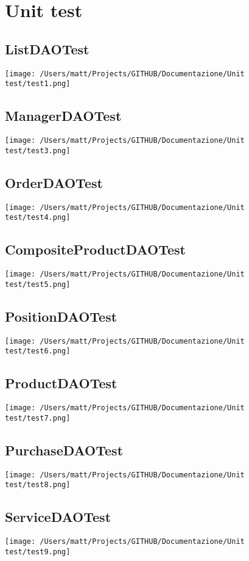 \chapter{Unit test}

\section{ListDAOTest}
\texttt{[image: /Users/matt/Projects/GITHUB/Documentazione/Unit test/test1.png]}

\section{ManagerDAOTest}
\texttt{[image: /Users/matt/Projects/GITHUB/Documentazione/Unit test/test3.png]}

\section{OrderDAOTest}
\texttt{[image: /Users/matt/Projects/GITHUB/Documentazione/Unit test/test4.png]}

\section{CompositeProductDAOTest}
\texttt{[image: /Users/matt/Projects/GITHUB/Documentazione/Unit test/test5.png]}

\section{PositionDAOTest}
\texttt{[image: /Users/matt/Projects/GITHUB/Documentazione/Unit test/test6.png]}

\section{ProductDAOTest}
\texttt{[image: /Users/matt/Projects/GITHUB/Documentazione/Unit test/test7.png]}

\section{PurchaseDAOTest}
\texttt{[image: /Users/matt/Projects/GITHUB/Documentazione/Unit test/test8.png]}

\section{ServiceDAOTest}
\texttt{[image: /Users/matt/Projects/GITHUB/Documentazione/Unit test/test9.png]}

